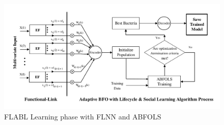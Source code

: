 \documentclass[runningheads]{llncs}
\begin{document}
%	    				
%	    


\begin{figure}
	\begin{center}
		\includegraphics[width=1.0\textwidth =0cm 0cm 0cm 0cm, clip]{images/pdf/FLBFONN_training.pdf}
		\caption{ FLABL Learning phase with FLNN and ABFOLS }
		\label{FLBFONN_process}
	\end{center}
\end{figure}
\end{document}
